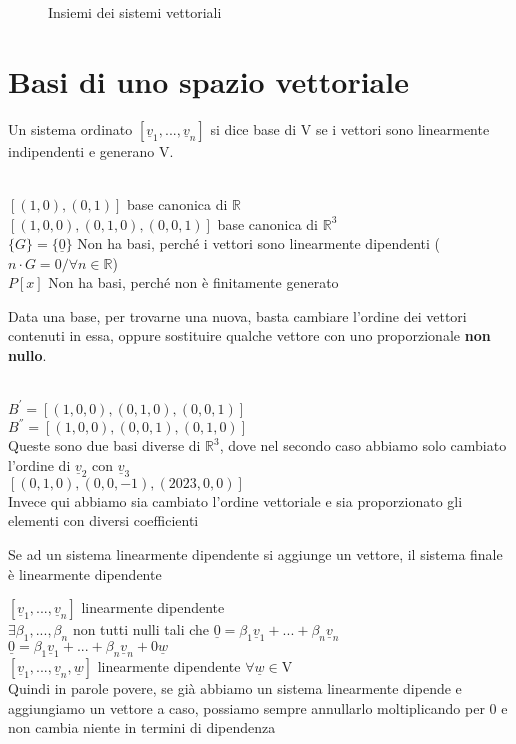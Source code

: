 \begin{figure}[H]
	\centering
	\caption[Caption]{Insiemi dei sistemi vettoriali}
	\label{fig:insiemisistemivett}
\end{figure}

\section{Basi di uno spazio vettoriale}

Un sistema ordinato $[\underline{v}_1,...,\underline{v}_n]$ si dice base di V se i vettori sono linearmente indipendenti e generano V.
\begin{nota}
	\phantom{}\\
	$[(1,0),(0,1)]$ base canonica di $\mathbb{R}$\\
	$[(1,0,0),(0,1,0),(0,0,1)]$ base canonica di $\mathbb{R}^3$\\
	$\{G\}=\{\underline{0}\}$ Non ha basi, perché i vettori sono linearmente dipendenti ($n\cdot G=0/\forall n\in \mathbb{R}$)\\
	$P[x]$ Non ha basi, perché non è finitamente generato
\end{nota}

Data una base, per trovarne una nuova, basta cambiare l'ordine dei vettori contenuti in essa, oppure sostituire qualche vettore con uno proporzionale \textbf{non nullo}.

\begin{es}
	\phantom{}\\
	$B^{'}=[(1,0,0),(0,1,0),(0,0,1)]$\\
	$B^{''}=[(1,0,0),(0,0,1),(0,1,0)]$\\
	Queste sono due basi diverse di $\mathbb{R}^3$, dove nel secondo caso abbiamo solo cambiato l'ordine di $\underline{v}_2$ con $\underline{v}_3$\\
	$[(0,1,0),(0,0,-1),(2023,0,0)]$\\
	Invece qui abbiamo sia cambiato l'ordine vettoriale e sia proporzionato gli elementi con diversi coefficienti
\end{es}

\begin{nota}[DIP+1=DIP]
	Se ad un sistema linearmente dipendente si aggiunge un vettore, il sistema finale è linearmente dipendente
	\begin{dimostrazione}
		$[\underline{v}_1,...,\underline{v}_n]$ linearmente dipendente\\
		$\exists\beta_1,...,\beta_n$ non tutti nulli tali che $\underline{0}=\beta_1\underline{v}_1+...+\beta_n\underline{v}_n$\\
		$\underline{0}=\beta_1\underline{v}_1+...+\beta_n\underline{v}_n+0\underline{w}$\\
		$[\underline{v}_1,...,\underline{v}_n,\underline{w}]$ linearmente dipendente $\forall\underline{w}\in$V\\
		Quindi in parole povere, se già abbiamo un sistema linearmente dipende e aggiungiamo un vettore a caso, possiamo sempre annullarlo moltiplicando per 0 e non cambia niente in termini di dipendenza
	\end{dimostrazione}
\end{nota}

